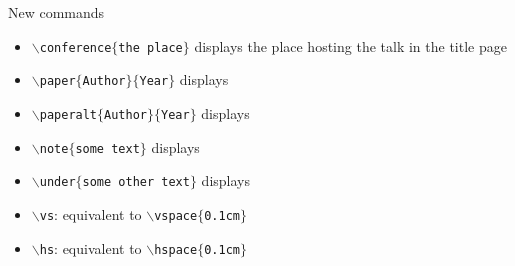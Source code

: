 \documentclass[10pt,numbering,toc]{bpslides}
\begin{document}
\begin{frame}{New commands}
	\begin{itemize}
	\item \texttt{$\backslash$conference$\{$the place$\}$} displays the place hosting the talk in the title page\vs
	\item \texttt{$\backslash$paper$\{$Author$\}\{$Year$\}$} displays \vs
	\item \texttt{$\backslash$paperalt$\{$Author$\}\{$Year$\}$} displays \vs
	\item \texttt{$\backslash$note$\{$some text$\}$} displays \vs
	\item \texttt{$\backslash$under$\{$some other text$\}$} displays \vs
	\item \texttt{$\backslash$vs}: equivalent to \texttt{$\backslash$vspace$\{$0.1cm$\}$}\vs
	\item \texttt{$\backslash$hs}: equivalent to \texttt{$\backslash$hspace$\{$0.1cm$\}$}\vs
	\end{itemize}
\end{frame}
\end{document}
